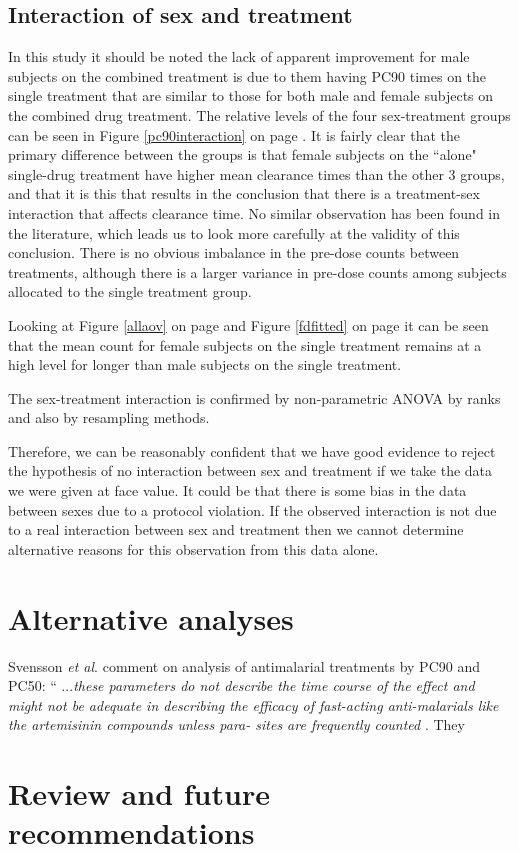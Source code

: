 \subsection{Interaction of sex and treatment}
In this study it should be noted the lack of apparent improvement for male subjects on the combined treatment is due to them having PC90 times on the single treatment that are similar to those for both male and female subjects on the combined drug treatment. The relative levels of the four sex-treatment groups can be seen in Figure \ref{pc90interaction} on page \pageref{pc90interaction}. It is fairly clear that the primary difference between the groups is that female subjects on the ``alone" single-drug treatment have higher mean clearance times than the other 3 groups, and that it is this that results in the conclusion that there is a treatment-sex interaction that affects clearance time. No similar observation has been found in the literature, which leads us to look more carefully at the validity of this conclusion. There is no obvious imbalance in the pre-dose counts between treatments, although there is a larger variance in pre-dose counts among subjects allocated to the single treatment group.

Looking at Figure \ref{allaov} on page \pageref{allaov} and Figure \ref{fdfitted} on page \pageref{fdfitted} it can be seen that the mean count for female subjects on the single treatment remains at a high level for longer than male subjects on the single treatment.

The sex-treatment interaction is confirmed by non-parametric ANOVA by ranks and also by resampling methods.

Therefore, we can be reasonably confident that we have good evidence to reject the hypothesis of no interaction between sex and treatment if we take the data we were given at face value. It could be that there is some bias in the data between sexes due to a protocol violation. If the observed interaction is not due to a real interaction between sex and treatment then we cannot determine alternative reasons for this observation from this data alone.

\section{Alternative analyses}
Svensson {\it et al}.  comment on analysis of antimalarial treatments by PC90 and PC50: ``
...\textit{these parameters do not 
describe the time course of the effect and might not be 
adequate in describing the efficacy of fast-acting anti-malarials like the artemisinin compounds unless para- 
sites are frequently counted} \cite{svensson}. They 

\section{Review and future recommendations}